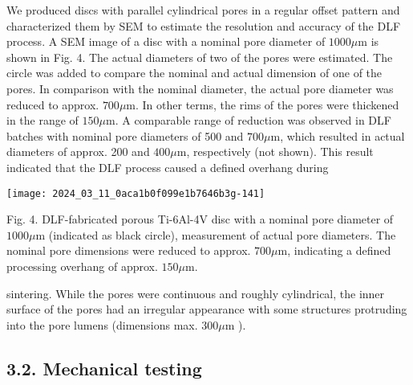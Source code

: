 \documentclass[10pt]{article}
\begin{document}
We produced discs with parallel cylindrical pores in a regular offset pattern and characterized them by SEM to estimate the resolution and accuracy of the DLF process. A SEM image of a disc with a nominal pore diameter of $1000 \mu \mathrm{m}$ is shown in Fig. 4. The actual diameters of two of the pores were estimated. The circle was added to compare the nominal and actual dimension of one of the pores. In comparison with the nominal diameter, the actual pore diameter was reduced to approx. $700 \mu \mathrm{m}$. In other terms, the rims of the pores were thickened in the range of $150 \mu \mathrm{m}$. A comparable range of reduction was observed in DLF batches with nominal pore diameters of 500 and $700 \mu \mathrm{m}$, which resulted in actual diameters of approx. 200 and $400 \mu \mathrm{m}$, respectively (not shown). This result indicated that the DLF process caused a defined overhang during

\begin{center}
\texttt{[image: 2024\_03\_11\_0aca1b0f099e1b7646b3g-141]}
\end{center}

Fig. 4. DLF-fabricated porous Ti-6Al-4V disc with a nominal pore diameter of $1000 \mu \mathrm{m}$ (indicated as black circle), measurement of actual pore diameters. The nominal pore dimensions were reduced to approx. $700 \mu \mathrm{m}$, indicating a defined processing overhang of approx. $150 \mu \mathrm{m}$.

sintering. While the pores were continuous and roughly cylindrical, the inner surface of the pores had an irregular appearance with some structures protruding into the pore lumens (dimensions max. $300 \mu \mathrm{m}$ ).

\subsection*{3.2. Mechanical testing}
\end{document}
